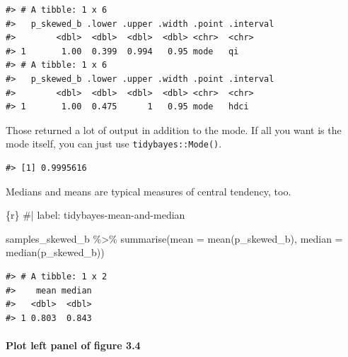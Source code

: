 \documentclass[
  letterpaper,
  DIV=11,
  numbers=noendperiod]{scrreprt}
\let\oldparagraph\paragraph
\renewcommand{\paragraph}[1]{\oldparagraph{#1}\mbox{}}
\newenvironment{Shaded}{\begin{snugshade}}{\end{snugshade}}
\newcommand{\AttributeTok}[1]{\textcolor[rgb]{0.40,0.45,0.13}{#1}}
\newcommand{\CommentTok}[1]{\textcolor[rgb]{0.37,0.37,0.37}{#1}}
\newcommand{\FunctionTok}[1]{\textcolor[rgb]{0.28,0.35,0.67}{#1}}
\newcommand{\InformationTok}[1]{\textcolor[rgb]{0.37,0.37,0.37}{#1}}
\newcommand{\NormalTok}[1]{\textcolor[rgb]{0.00,0.23,0.31}{#1}}
\newcommand{\SpecialCharTok}[1]{\textcolor[rgb]{0.37,0.37,0.37}{#1}}
\begin{document}
\begin{verbatim}
#> # A tibble: 1 x 6
#>   p_skewed_b .lower .upper .width .point .interval
#>        <dbl>  <dbl>  <dbl>  <dbl> <chr>  <chr>    
#> 1       1.00  0.399  0.994   0.95 mode   qi       
#> # A tibble: 1 x 6
#>   p_skewed_b .lower .upper .width .point .interval
#>        <dbl>  <dbl>  <dbl>  <dbl> <chr>  <chr>    
#> 1       1.00  0.475      1   0.95 mode   hdci
\end{verbatim}

Those returned a lot of output in addition to the mode. If all you want
is the mode itself, you can just use \texttt{tidybayes::Mode()}.

\begin{Shaded}
\end{Shaded}

\begin{verbatim}
#> [1] 0.9995616
\end{verbatim}

Medians and means are typical measures of central tendency, too.

\begin{Shaded}
\begin{Highlighting}[]
\InformationTok{\textasciigrave{}\textasciigrave{}\textasciigrave{}\{r\}}
\CommentTok{\#| label: tidybayes{-}mean{-}and{-}median}

\NormalTok{samples\_skewed\_b }\SpecialCharTok{\%\textgreater{}\%} 
  \FunctionTok{summarise}\NormalTok{(}\AttributeTok{mean   =} \FunctionTok{mean}\NormalTok{(p\_skewed\_b),}
            \AttributeTok{median =} \FunctionTok{median}\NormalTok{(p\_skewed\_b))}
\InformationTok{\textasciigrave{}\textasciigrave{}\textasciigrave{}}
\end{Highlighting}
\end{Shaded}

\begin{verbatim}
#> # A tibble: 1 x 2
#>    mean median
#>   <dbl>  <dbl>
#> 1 0.803  0.843
\end{verbatim}

\hypertarget{plot-left-panel-of-figure-3.4}{%
\paragraph{Plot left panel of figure
3.4}\label{plot-left-panel-of-figure-3.4}}
\end{document}
